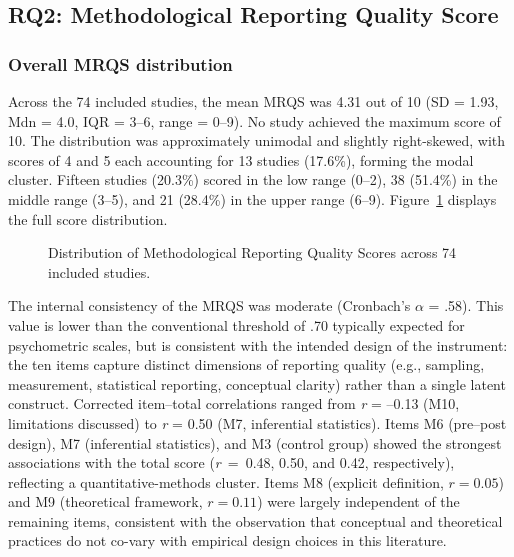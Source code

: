 \documentclass[etq]{acnsart}
\begin{document}
	
	
	\subsection{RQ2: Methodological Reporting Quality Score}
	\label{sec:results_rq2}
	
	\subsubsection{Overall MRQS distribution}
	\label{sec:results_rq2_overall}
	
	Across the 74 included studies, the mean MRQS was 4.31 out of 10 (SD = 1.93, Mdn = 4.0, IQR = 3--6, range = 0--9). No study achieved the maximum score of 10. The distribution was approximately unimodal and slightly right-skewed, with scores of 4 and 5 each accounting for 13 studies (17.6\%), forming the modal cluster. Fifteen studies (20.3\%) scored in the low range (0--2), 38 (51.4\%) in the middle range (3--5), and 21 (28.4\%) in the upper range (6--9). Figure~\ref{fig:mrqs_dist} displays the full score distribution.
	
	\begin{figure}[ht]
		\centering
		\caption{Distribution of Methodological Reporting Quality Scores across 74 included studies.}
		\label{fig:mrqs_dist}
	\end{figure}
	
	The internal consistency of the MRQS was moderate (Cronbach's $\alpha$ = .58). This value is lower than the conventional threshold of .70 typically expected for psychometric scales, but is consistent with the intended design of the instrument: the ten items capture distinct dimensions of reporting quality (e.g., sampling, measurement, statistical reporting, conceptual clarity) rather than a single latent construct. Corrected item--total correlations ranged from \textit{r} = --0.13 (M10, limitations discussed) to \textit{r} = 0.50 (M7, inferential statistics). Items M6 (pre--post design), M7 (inferential statistics), and M3 (control group) showed the strongest associations with the total score (\textit{r}~=~0.48, 0.50, and 0.42, respectively), reflecting a quantitative-methods cluster. Items M8 (explicit definition, $r = 0.05$) and M9 (theoretical framework, $r = 0.11$) were largely independent of the remaining items, consistent with the observation that conceptual and theoretical practices do not co-vary with empirical design choices in this literature.
	
\end{document}
